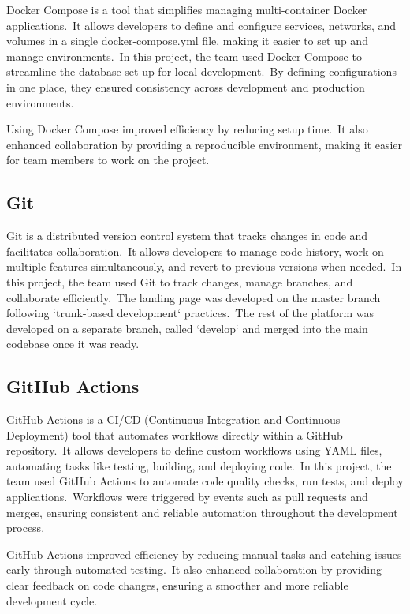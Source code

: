 Docker Compose is a tool that simplifies managing multi-container Docker applications.\ It allows developers to define and configure services, networks, and volumes in a single docker-compose.yml file, making it easier to set up and manage environments.\ In this project, the team used Docker Compose to streamline the database set-up for local development.\ By defining configurations in one place, they ensured consistency across development and production environments.\cite[Docker Compose]{dockerCompose}

Using Docker Compose improved efficiency by reducing setup time.\ It also enhanced collaboration by providing a reproducible environment, making it easier for team members to work on the project.

\subsection{Git}\label{subsec:git}

Git is a distributed version control system that tracks changes in code and facilitates collaboration.\ It allows developers to manage code history, work on multiple features simultaneously, and revert to previous versions when needed.\ In this project, the team used Git to track changes, manage branches, and collaborate efficiently.\ The landing page was developed on the master branch following `trunk-based development` practices.\ The rest of the platform was developed on a separate branch, called `develop` and merged into the main codebase once it was ready.\cite[Git]{git}

\subsection{GitHub Actions}\label{subsec:github-actions}

GitHub Actions is a CI/CD (Continuous Integration and Continuous Deployment) tool that automates workflows directly within a GitHub repository.\ It allows developers to define custom workflows using YAML files, automating tasks like testing, building, and deploying code.\ In this project, the team used GitHub Actions to automate code quality checks, run tests, and deploy applications.\ Workflows were triggered by events such as pull requests and merges, ensuring consistent and reliable automation throughout the development process.\cite[GitHub Actions]{githubActions}

GitHub Actions improved efficiency by reducing manual tasks and catching issues early through automated testing.\ It also enhanced collaboration by providing clear feedback on code changes, ensuring a smoother and more reliable development cycle.


